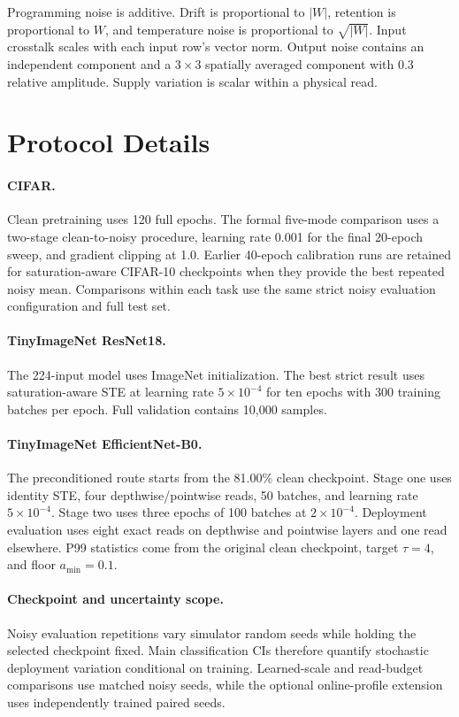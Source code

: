 \documentclass[10pt,twocolumn,letterpaper]{article}
\begin{document}
Programming noise is additive.  Drift is proportional to $|W|$, retention is
proportional to $W$, and temperature noise is proportional to $\sqrt{|W|}$.
Input crosstalk scales with each input row's vector norm.  Output noise contains
an independent component and a $3\times3$ spatially averaged component with
0.3 relative amplitude.  Supply variation is scalar within a physical read.

\section{Protocol Details}
\label{app:protocols}

\paragraph{CIFAR.}
Clean pretraining uses 120 full epochs.  The formal five-mode comparison uses a
two-stage clean-to-noisy procedure, learning rate 0.001 for the final 20-epoch
sweep, and gradient clipping at 1.0.  Earlier 40-epoch calibration runs are
retained for saturation-aware CIFAR-10 checkpoints when they provide the best
repeated noisy mean.  Comparisons within each task use the same strict noisy
evaluation configuration and full test set.

\paragraph{TinyImageNet ResNet18.}
The 224-input model uses ImageNet initialization.  The best strict result uses
saturation-aware STE at learning rate $5\times10^{-4}$ for ten epochs with 300
training batches per epoch.  Full validation contains 10,000 samples.

\paragraph{TinyImageNet EfficientNet-B0.}
The preconditioned route starts from the 81.00\% clean checkpoint.  Stage one
uses identity STE, four depthwise/pointwise reads, 50 batches, and learning rate
$5\times10^{-4}$.  Stage two uses three epochs of 100 batches at
$2\times10^{-4}$.  Deployment evaluation uses eight exact reads on depthwise
and pointwise layers and one read elsewhere.  P99 statistics come from the
original clean checkpoint, target $\tau=4$, and floor $a_{\min}=0.1$.

\paragraph{Checkpoint and uncertainty scope.}
Noisy evaluation repetitions vary simulator random seeds while holding the
selected checkpoint fixed.  Main classification CIs therefore quantify
stochastic deployment variation conditional on training.  Learned-scale and
read-budget comparisons use matched noisy seeds, while the optional
online-profile extension uses independently trained paired seeds.
\end{document}
